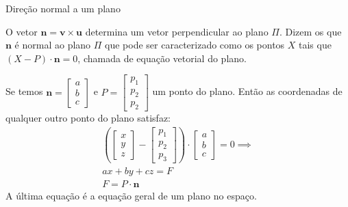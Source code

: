 \documentclass{beamer}
\begin{document}
\begin{frame}{Direção normal a um plano}

  O vetor $\mathbf{n}=\mathbf{v}\times \mathbf{u}$ determina um vetor perpendicular ao plano $\Pi$. Dizem os que $\mathbf{n}$ é normal ao plano
  $\Pi$ que pode ser caracterizado como os pontos $X$ tais que $(X-P)\cdot \mathbf{n}=0$, chamada de equação vetorial do plano.

  Se temos $\mathbf{n} = \begin{bmatrix}
    a \\ b \\ c
  \end{bmatrix}$ e $P = \begin{bmatrix}
    p_1 \\ p_2 \\ p_2
  \end{bmatrix}$  um ponto do plano. Então as coordenadas de qualquer outro ponto do plano satisfaz:
  \begin{gather*}
    \left(\begin{bmatrix}
      x \\ y \\ z
    \end{bmatrix} - \begin{bmatrix}
      p_1 \\ p_2 \\ p_3
    \end{bmatrix}\right)\cdot \begin{bmatrix}
      a \\ b \\ c 
    \end{bmatrix}= 0 \implies \\
    ax+by+cz = F \\
    F = P\cdot \mathbf{n}
  \end{gather*}
  A última equação é a equação geral de um plano no espaço.
\end{frame}
\end{document}

